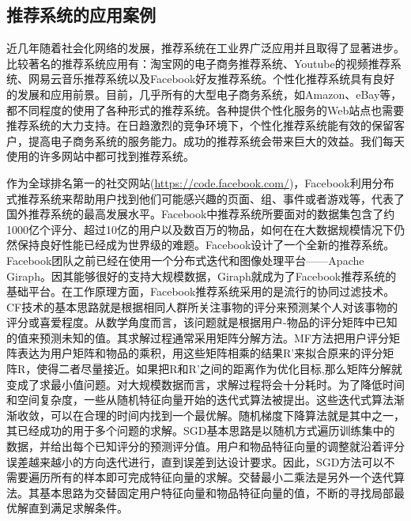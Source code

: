 	\subsection{推荐系统的应用案例}
	近几年随着社会化网络的发展，推荐系统在工业界广泛应用并且取得了显著进步。比较著名的推荐系统应用有：淘宝网的电子商务推荐系统、Youtube的视频推荐系统\citep{recmd-youtube}、网易云音乐推荐系统以及Facebook好友推荐系统。个性化推荐系统具有良好的发展和应用前景。目前，几乎所有的大型电子商务系统，如Amazon、eBay等，都不同程度的使用了各种形式的推荐系统。各种提供个性化服务的Web站点也需要推荐系统的大力支持。在日趋激烈的竞争环境下，个性化推荐系统能有效的保留客户，提高电子商务系统的服务能力。成功的推荐系统会带来巨大的效益。我们每天使用的许多网站中都可找到推荐系统。

	作为全球排名第一的社交网站(\href{https://code.facebook.com/posts/861999383875667/recommending-items-to-more-than-a-billion-people/}{https://code.facebook.com/})，Facebook利用分布式推荐系统来帮助用户找到他们可能感兴趣的页面、组、事件或者游戏等，代表了国外推荐系统的最高发展水平。Facebook中推荐系统所要面对的数据集包含了约1000亿个评分、超过10亿的用户以及数百万的物品，如何在在大数据规模情况下仍然保持良好性能已经成为世界级的难题。Facebook设计了一个全新的推荐系统。Facebook团队之前已经在使用一个分布式迭代和图像处理平台——Apache Giraph。因其能够很好的支持大规模数据，Giraph就成为了Facebook推荐系统的基础平台。在工作原理方面，Facebook推荐系统采用的是流行的协同过滤技术。CF技术的基本思路就是根据相同人群所关注事物的评分来预测某个人对该事物的评分或喜爱程度。从数学角度而言，该问题就是根据用户-物品的评分矩阵中已知的值来预测未知的值。其求解过程通常采用矩阵分解方法。MF方法把用户评分矩阵表达为用户矩阵和物品的乘积，用这些矩阵相乘的结果R’来拟合原来的评分矩阵R，使得二者尽量接近。如果把R和R’之间的距离作为优化目标,那么矩阵分解就变成了求最小值问题。对大规模数据而言，求解过程将会十分耗时。为了降低时间和空间复杂度，一些从随机特征向量开始的迭代式算法被提出。这些迭代式算法渐渐收敛，可以在合理的时间内找到一个最优解。随机梯度下降算法就是其中之一，其已经成功的用于多个问题的求解。SGD基本思路是以随机方式遍历训练集中的数据，并给出每个已知评分的预测评分值。用户和物品特征向量的调整就沿着评分误差越来越小的方向迭代进行，直到误差到达设计要求。因此，SGD方法可以不需要遍历所有的样本即可完成特征向量的求解。交替最小二乘法是另外一个迭代算法。其基本思路为交替固定用户特征向量和物品特征向量的值，不断的寻找局部最优解直到满足求解条件。


